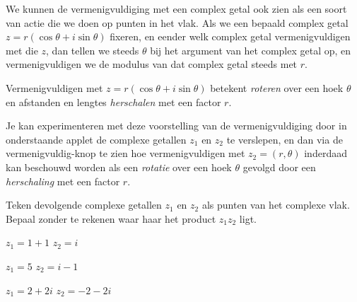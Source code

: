 \documentclass{ximera}
\begin{document}
\begin{xmuitweiding}
We kunnen de vermenigvuldiging met een complex getal ook zien als een soort van actie die we doen op punten in het vlak. Als we een bepaald complex getal $z = r(\cos\theta + i \sin \theta)$ fixeren, en eender welk complex getal vermenigvuldigen met die $z$, dan tellen we steeds $\theta$ bij het argument van het complex getal op, en vermenigvuldigen we de modulus van dat complex getal steeds met $r$.
 
\begin{proposition}[Vermenigvuldiging met een complex getal in goniometrische schrijfwijze $z=r(\cos\theta + i\sin\theta)$]\nl
     
Vermenigvuldigen met $z = r(\cos\theta + i\sin\theta)$ betekent \textit{roteren} over een hoek $\theta$ en afstanden en lengtes \textit{herschalen} met een factor $r$.
\end{proposition}
 
Je kan experimenteren met deze voorstelling van de vermenigvuldiging door in onderstaande applet de complexe getallen $z_1$ en $z_2$ te verslepen, en dan via de vermenigvuldig-knop te zien hoe vermenigvuldigen met $z_2 = (r,\theta)$ inderdaad kan beschouwd worden als een \textit{rotatie} over een hoek $\theta$ gevolgd door een \textit{herschaling} met een factor $r$.
 
\end{xmuitweiding}


\begin{exercise}
    Teken devolgende complexe getallen \(z_1\) en \(z_2\) als punten van het complexe vlak. Bepaal zonder te rekenen waar haar het product \( z_1 z_2\) ligt. 
    \begin{question} \(z_1 = 1+1\) \(z_2 = i\)    \end{question}
    \begin{question} \(z_1 = 5\) \(z_2 = i - 1\)\end{question}
    \begin{question} \(z_1 = 2 + 2i\) \(z_2 = -2 - 2i \) \end{question}
\end{exercise}

 
 
\end{document}
